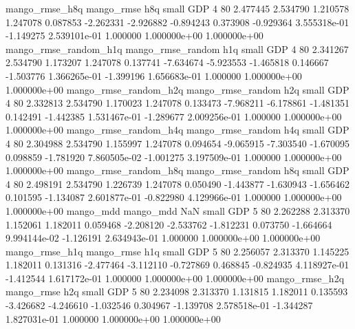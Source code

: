        mango_rmse_h8q        mango_rmse                  h8q      small      GDP                 4 80 2.477445       2.534790 1.210578       1.247078    0.087853     -2.262331     -2.926882    -0.894243       0.373908 -0.929364 3.555318e-01    -1.149275   2.539101e-01            1.000000    1.000000e+00        1.000000e+00
mango_rmse_random_h1q mango_rmse_random                  h1q      small      GDP                 4 80 2.341267       2.534790 1.173207       1.247078    0.137741     -7.634674     -5.923553    -1.465818       0.146667 -1.503776 1.366265e-01    -1.399196   1.656683e-01            1.000000    1.000000e+00        1.000000e+00
mango_rmse_random_h2q mango_rmse_random                  h2q      small      GDP                 4 80 2.332813       2.534790 1.170023       1.247078    0.133473     -7.968211     -6.178861    -1.481351       0.142491 -1.442385 1.531467e-01    -1.289677   2.009256e-01            1.000000    1.000000e+00        1.000000e+00
mango_rmse_random_h4q mango_rmse_random                  h4q      small      GDP                 4 80 2.304988       2.534790 1.155997       1.247078    0.094654     -9.065915     -7.303540    -1.670095       0.098859 -1.781920 7.860505e-02    -1.001275   3.197509e-01            1.000000    1.000000e+00        1.000000e+00
mango_rmse_random_h8q mango_rmse_random                  h8q      small      GDP                 4 80 2.498191       2.534790 1.226739       1.247078    0.050490     -1.443877     -1.630943    -1.656462       0.101595 -1.134087 2.601877e-01    -0.822980   4.129966e-01            1.000000    1.000000e+00        1.000000e+00
            mango_mdd         mango_mdd                  NaN      small      GDP                 5 80 2.262288       2.313370 1.152061       1.182011    0.059468     -2.208120     -2.533762    -1.812231       0.073750 -1.664664 9.994144e-02    -1.126191   2.634943e-01            1.000000    1.000000e+00        1.000000e+00
       mango_rmse_h1q        mango_rmse                  h1q      small      GDP                 5 80 2.256057       2.313370 1.145225       1.182011    0.131316     -2.477464     -3.112110    -0.727869       0.468845 -0.824935 4.118927e-01    -1.412544   1.617172e-01            1.000000    1.000000e+00        1.000000e+00
       mango_rmse_h2q        mango_rmse                  h2q      small      GDP                 5 80 2.234098       2.313370 1.131815       1.182011    0.135593     -3.426682     -4.246610    -1.032546       0.304967 -1.139708 2.578518e-01    -1.344287   1.827031e-01            1.000000    1.000000e+00        1.000000e+00
